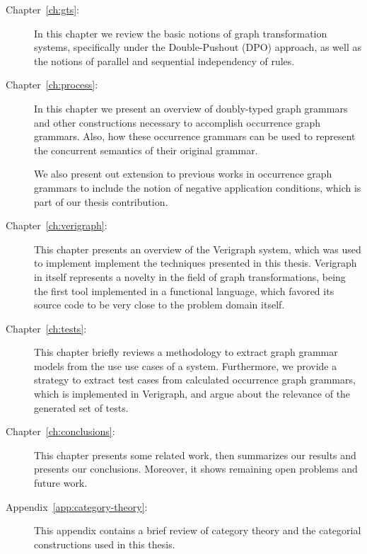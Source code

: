 \begin{description}
  \item[Chapter~\ref{ch:gts}:] In this chapter we review the basic notions of graph transformation systems, specifically under the Double-Pushout (DPO) approach, as well as the notions of parallel and sequential independency of rules.

  \item[Chapter~\ref{ch:process}:] In this chapter we present an overview of doubly-typed graph grammars and other constructions necessary to accomplish occurrence graph grammars. Also, how these occurrence grammars can be used to represent the concurrent semantics of their original grammar.

    We also present out extension to previous works in occurrence graph grammars to include the notion of negative application conditions, which is part of our thesis contribution.

  \item[Chapter~\ref{ch:verigraph}:] This chapter presents an overview of the Verigraph system, which was used to implement implement the techniques presented in this thesis. Verigraph in itself represents a novelty in the field of graph transformations, being the first tool implemented in a functional language, which favored its source code to be very close to the problem domain itself.

  \item[Chapter~\ref{ch:tests}:] This chapter briefly reviews a methodology to extract graph grammar models from the use use cases of a system. Furthermore, we provide a strategy to extract test cases from calculated occurrence graph grammars, which is implemented in Verigraph, and argue about the relevance of the generated set of tests.

  \item[Chapter~\ref{ch:conclusions}:] This chapter presents some related work, then summarizes our results and presents our conclusions. Moreover, it shows remaining open problems and future work.

  \item[Appendix~\ref{app:category-theory}:] This appendix contains a brief review of category theory and the categorial constructions used in this thesis.

\end{description}
